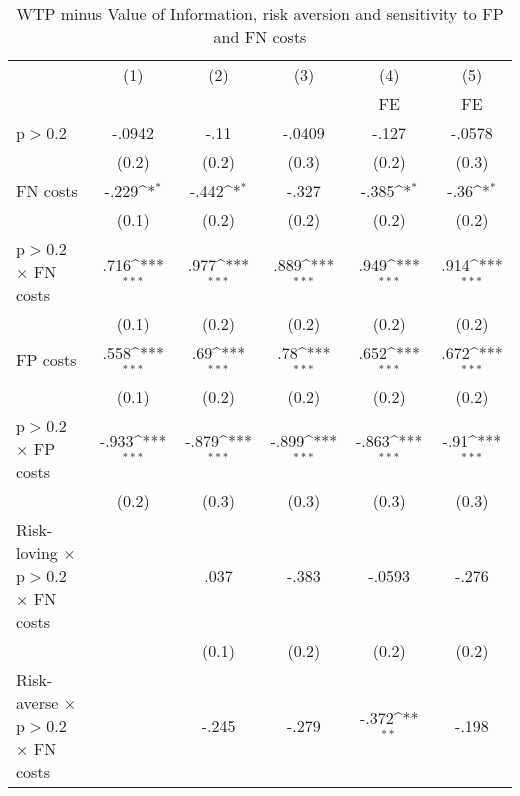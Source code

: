 \begin{table}[htbp]\centering
\def\sym#1{\ifmmode^{#1}\else\(^{#1}\)\fi}
\caption{WTP minus Value of Information, risk aversion and sensitivity to FP and FN costs}
\begin{tabular}{l*{5}{c}}
\hline\hline
                &\multicolumn{1}{c}{(1)}&\multicolumn{1}{c}{(2)}&\multicolumn{1}{c}{(3)}&\multicolumn{1}{c}{(4)}&\multicolumn{1}{c}{(5)}\\
                &\multicolumn{1}{c}{}&\multicolumn{1}{c}{}&\multicolumn{1}{c}{}&\multicolumn{1}{c}{FE}&\multicolumn{1}{c}{FE}\\
\hline
p$>$0.2         &   -.0942         &     -.11         &   -.0409         &    -.127         &   -.0578         \\
                &    (0.2)         &    (0.2)         &    (0.3)         &    (0.2)         &    (0.3)         \\
FN costs        &    -.229\sym{*}  &    -.442\sym{*}  &    -.327         &    -.385\sym{*}  &     -.36\sym{*}  \\
                &    (0.1)         &    (0.2)         &    (0.2)         &    (0.2)         &    (0.2)         \\
p$>$0.2 $\times$ FN costs&     .716\sym{***}&     .977\sym{***}&     .889\sym{***}&     .949\sym{***}&     .914\sym{***}\\
                &    (0.1)         &    (0.2)         &    (0.2)         &    (0.2)         &    (0.2)         \\
FP costs        &     .558\sym{***}&      .69\sym{***}&      .78\sym{***}&     .652\sym{***}&     .672\sym{***}\\
                &    (0.1)         &    (0.2)         &    (0.2)         &    (0.2)         &    (0.2)         \\
p$>$0.2 $\times$ FP costs&    -.933\sym{***}&    -.879\sym{***}&    -.899\sym{***}&    -.863\sym{***}&     -.91\sym{***}\\
                &    (0.2)         &    (0.3)         &    (0.3)         &    (0.3)         &    (0.3)         \\
Risk-loving $\times$ p$>$0.2 $\times$ FN costs&                  &     .037         &    -.383         &   -.0593         &    -.276         \\
                &                  &    (0.1)         &    (0.2)         &    (0.2)         &    (0.2)         \\
Risk-averse $\times$ p$>$0.2 $\times$ FN costs&                  &    -.245         &    -.279         &    -.372\sym{**} &    -.198         \\

\end{tabular}
\end{table}
